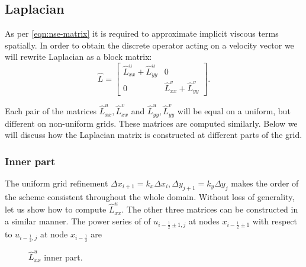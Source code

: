 \documentclass{article}
\numberwithin{equation}{section}
\begin{document}
\subsection{Laplacian}\label{subsec:laplacian}

As per \cref{eqn:nse-matrix} it is required to approximate implicit viscous terms spatially. In order to obtain the discrete operator acting on a velocity vector we will rewrite Laplacian as a block matrix:
\begin{equation*}
	\hat L=
	\begin{bmatrix}
  \hat{L}^u_{xx}+\hat{L}^u_{yy} & 0 \\
  0 & \hat{L}^v_{xx}+\hat{L}^v_{yy}
\end{bmatrix}.
\end{equation*}

Each pair of the matrices $\hat{L}^u_{xx},\hat{L}^v_{xx}$ and $\hat{L}^u_{yy},\hat{L}^v_{yy}$ will be equal on a uniform, but different on non-uniform grids. These matrices are computed similarly. Below we will discuss how the Laplacian matrix is constructed at different parts of the grid.

\subsubsection{Inner part}\label{subsubsec:laplacian-inner}
The uniform grid refinement $\Delta x_{i+1}=k_x\Delta x_i,\Delta y_{j+1}=k_y\Delta y_j$ makes the order of the scheme consistent throughout the whole domain. Without loss of generality, let us show how to compute $\hat{L}^u_{xx}$. The other three matrices can be constructed in a similar manner. The power series of of $u_{i-\frac{1}{2}\pm 1,j}$ at nodes $x_{i - \frac{1}{2}\pm 1}$ with respect to $u_{i - \frac{1}{2},j}$ at node $x_{i-\frac{1}{2}}$ are

\begin{figure}[H] %
  \caption{$\hat{L}^u_{xx}$ inner part.}\label{fig:luxx-inner}
\end{figure}
\end{document}
